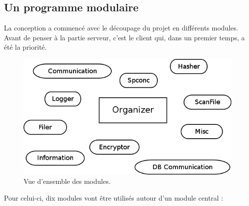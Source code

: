 \documentclass[a4paper,10pt, twoside]{report}
\begin{document}
\begin{spacing}{1.2}
\subsection{Un programme modulaire}

La conception a commencé avec le découpage du projet en différents modules.
Avant de penser à la partie serveur, c'est le client qui, dans un premier
temps, a été la priorité.

\begin{figure}[h!]
  \centering
  \includegraphics[scale=0.51]{softwareDesign/overviewModule.png}
  \caption{\label{overviewModule} Vue d'ensemble des modules.}
\end{figure}

Pour celui-ci, dix modules vont être utilisés autour d'un module central :


\end{spacing}
\end{document}
